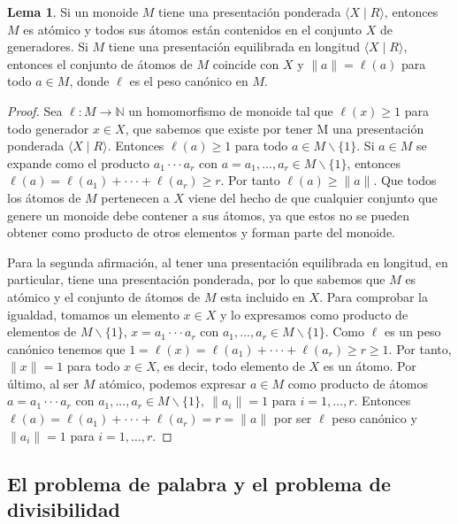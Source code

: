 \documentclass[12pt]{book}
\theoremstyle{definition}
\newtheorem{lema}{Lema}[section]
\providecommand{\norm}[1]{\lVert#1\rVert}
\begin{document}
\begin{lema}
Si un monoide $M$ tiene una presentación ponderada $\langle X\mid R\rangle$, entonces $M$ es atómico y todos sus átomos están contenidos en el conjunto $X$ de generadores. Si $M$ tiene una presentación equilibrada en longitud $\langle X\mid R\rangle$, entonces el conjunto de átomos de $M$ coincide con $X$ y $\norm{a}=\ell(a)$ para todo $a\in M$, donde $\ell$ es el peso canónico en $M$.
\label{lema:presen_mono}
\end{lema}

\begin{proof} Sea $\ell: M\rightarrow \mathbb{N}$ un homomorfismo de monoide tal que $\ell(x)\geq 1$ para todo generador $x\in X$, que sabemos que existe por tener M  una presentación ponderada $\langle X\mid R\rangle$. Entonces $\ell(a)\geq 1$ para todo $a\in M \backslash\{1\}$. Si $a\in M$ se expande como el producto $a_1\cdot\cdot\cdot a_r$ con $a = a_1,...,a_r\in M\backslash\{1\}$, entonces $\ell(a)=\ell(a_1)+\cdot\cdot\cdot+\ell(a_r)\geq r$. Por tanto $\ell(a)\geq \norm{a}$. Que todos los átomos de $M$ pertenecen a $X$ viene del hecho de que cualquier conjunto que genere un monoide debe contener a sus átomos, ya que estos no se pueden obtener como producto de otros elementos y forman parte del monoide. 

Para la segunda afirmación, al tener una presentación equilibrada en longitud, en particular, tiene una presentación ponderada, por lo que sabemos que $M$ es atómico y el conjunto de átomos de $M$ esta incluido en $X$. Para comprobar la igualdad, tomamos un elemento $x\in X$ y lo expresamos como producto de elementos de $M\backslash\{1\}$, $x = a_1\cdot\cdot\cdot a_r$ con $a_1,...,a_r\in M\backslash\{1\}$. Como $\ell$ es un peso canónico tenemos que $1=\ell(x)=\ell(a_1)+\cdot\cdot\cdot+\ell(a_r)\geq r\geq 1$. Por tanto, $\norm{x}=1$ para todo $x\in X$, es decir, todo elemento de $X$ es un átomo. Por último, al ser $M$ atómico, podemos expresar $a\in M$ como producto de átomos $a =a_1\cdot\cdot\cdot a_r$ con $a_1,...,a_r\in M\backslash\{1\},\ \norm{a_i}=1$  para $i=1,\ldots,r$. Entonces $\ell(a)=\ell(a_1)+\cdot\cdot\cdot+\ell(a_r) = r = \norm{a}$ por ser $\ell$ peso canónico y $\norm{a_i}=1$ para $i=1,\ldots,r$.
\end{proof}

\subsection{El problema de palabra y el problema de divisibilidad}
\end{document}
